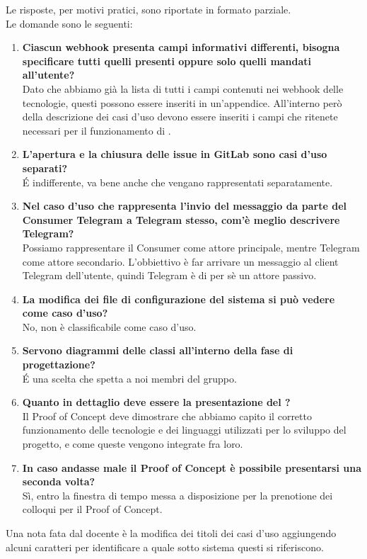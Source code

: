     	Le risposte, per motivi pratici, sono riportate in formato parziale.\\
        Le domande sono le seguenti:
    	
    	\begin{enumerate}
    		\item \textbf{Ciascun webhook presenta campi informativi differenti, bisogna specificare tutti quelli presenti oppure solo quelli mandati all'utente?}\\
            Dato che abbiamo già la lista di tutti i campi contenuti nei webhook delle tecnologie, questi possono essere inseriti in un'appendice. All'interno però della descrizione dei casi d'uso devono essere inseriti i campi che ritenete necessari per il funzionamento di \progetto.
    		\item \textbf{L'apertura e la chiusura delle issue in GitLab sono casi d'uso separati?}\\
            \'E indifferente, va bene anche che vengano rappresentati separatamente.
    		\item \textbf{Nel caso d'uso che rappresenta l'invio del messaggio da parte del Consumer Telegram a Telegram stesso, com'è meglio descrivere Telegram?}\\
            Possiamo rappresentare il Consumer come attore principale, mentre Telegram come attore secondario. L'obbiettivo è far arrivare un messaggio al client Telegram dell'utente, quindi Telegram è di per sè un attore passivo.
    		\item \textbf{La modifica dei file di configurazione del sistema si può vedere come caso d'uso?}\\
            No, non è classificabile come caso d'uso.
    		\item \textbf{Servono diagrammi delle classi all'interno della fase di progettazione?}\\
            \'E una scelta che spetta a noi membri del gruppo.
    		\item \textbf{Quanto in dettaglio deve essere la presentazione del ?}\\
            Il Proof of Concept deve dimostrare che abbiamo capito il corretto funzionamento delle tecnologie e dei linguaggi utilizzati per lo sviluppo del progetto, e come queste vengono integrate fra loro.
    		\item \textbf{In caso andasse male il Proof of Concept è possibile presentarsi una seconda volta?}\\
            Sì, entro la finestra di tempo messa a disposizione per la prenotione dei colloqui per il Proof of Concept.
    	\end{enumerate}
    	Una nota fata dal docente è la modifica dei titoli dei casi d'uso aggiungendo alcuni caratteri per identificare a quale sotto sistema questi si riferiscono.
